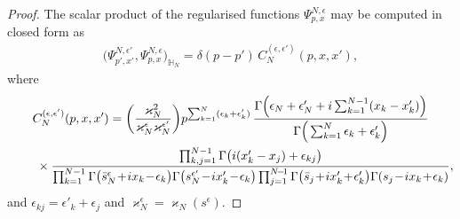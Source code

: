 \documentclass[11pt]{article}
\numberwithin{equation}{section}
\numberwithin{equation}{section}
\begin{document}
\begin{proof}
The scalar product of the regularised functions $\Psi^{N,\epsilon}_{p,{x}}$ may be computed in closed form as~\cite{Derkachov:2002tf}
\begin{gather*}
\big(\Psi^{N,\epsilon'}_{p',{x}'},\Psi^{N,\epsilon}_{p,{x}}\big)_{\mathbb H_N}=\delta(p-p') \, C_N^{(\epsilon, \epsilon')}(p, x, x'),
\end{gather*}
where
\begin{gather}
C_N^{( \epsilon, \epsilon')}(p, x, x') =\bigg(\frac{\varkappa_N^2}{\varkappa^{\epsilon}_N\varkappa^{\epsilon'}_N}\bigg)
p^{\sum_{k=1}^N(\epsilon_k+\epsilon'_k)} \,
\frac{\Gamma\Big(\epsilon_N+\epsilon'_N+{\rm i}\sum_{k=1}^{N-1}(x_k-x'_k)\Big)} {\Gamma\Big(\sum_{k=1}^N\epsilon_k+\epsilon'_k\Big)}\nonumber
\\ \qquad\
{}\times \frac{\prod_{k,j=1}^{N-1}\Gamma\big({\rm i}(x'_k-x_j)+\epsilon_{kj}\big)}
{\prod_{k=1}^{N-1}\Gamma\big( \bar s^\epsilon_N\!+\!{\rm i}x_k\!-\!\epsilon_k\big)
\Gamma\big(s_N^{\epsilon'}\!-\!{\rm i}x'_k\!-\!\epsilon_k\big)\prod_{j=1}^{N\!-\!1}
\Gamma\big( \bar s_j\!+\!{\rm i}x'_k\!+\!\epsilon'_k\big)
\Gamma(s_j\!-\!{\rm i}x_k\!+\!\epsilon_k)},\label{CNresult}
\end{gather}
and
$\epsilon_{kj}=\epsilon'_k+\epsilon_j$ and $\varkappa^{\epsilon}_N=\varkappa_N(
s^{\epsilon})$.


\end{proof}
\end{document}
